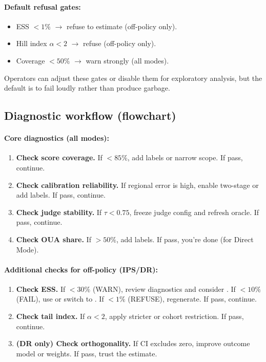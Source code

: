 \begin{enumerate}[resume]
\paragraph{Default refusal gates:}
\begin{itemize}
\item ESS $< 1\%$ $\to$ refuse to estimate (off-policy only).
\item Hill index $\alpha < 2$ $\to$ refuse (off-policy only).
\item Coverage $< 50\%$ $\to$ warn strongly (all modes).
\end{itemize}

Operators can adjust these gates or disable them for exploratory analysis, but the default is to fail loudly rather than produce garbage.

\subsection{Diagnostic workflow (flowchart)}

\paragraph{Core diagnostics (all modes):}
\begin{enumerate}
\item \textbf{Check score coverage.} If $< 85\%$, add labels or narrow scope. If pass, continue.
\item \textbf{Check calibration reliability.} If regional error is high, enable two-stage \autocal{} or add labels. If pass, continue.
\item \textbf{Check judge stability.} If $\tau < 0.75$, freeze judge config and refresh oracle. If pass, continue.
\item \textbf{Check OUA share.} If $> 50\%$, add labels. If pass, you're done (for Direct Mode).
\end{enumerate}

\paragraph{Additional checks for off-policy (IPS/DR):}
\begin{enumerate}[resume]
\item \textbf{Check ESS.} If $< 30\%$ (WARN), review diagnostics and consider \dr. If $< 10\%$ (FAIL), use \simcal{} or switch to \dr. If $< 1\%$ (REFUSE), regenerate. If pass, continue.
\item \textbf{Check tail index.} If $\alpha < 2$, apply stricter \simcal{} or cohort restriction. If pass, continue.
\item \textbf{(DR only) Check orthogonality.} If CI excludes zero, improve outcome model or weights. If pass, trust the estimate.
\end{enumerate}


\end{enumerate}

